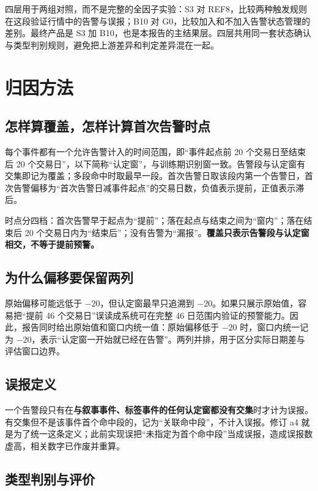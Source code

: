 \documentclass[12pt,a4paper]{ctexart}
\begin{document}
四层用于两组对照，而不是完整的全因子实验：S3 对 REF8，比较两种触发规则在这段验证行情中的告警与误报；B10 对 G0，比较加入和不加入告警状态管理的差别。最终产品是 S3 加 B10，也是本报告的主结果层。四层共用同一套状态确认与类型判别规则，避免把上游差异和判定差异混在一起。

\section{归因方法}

\subsection{怎样算覆盖，怎样计算首次告警时点}

每个事件都有一个允许告警计入的时间范围，即“事件起点前 20 个交易日至结束后 20 个交易日”，以下简称“认定窗”，与训练期识别窗一致。告警段与认定窗有交集即记为覆盖；多段命中时取最早一段。首次告警日取该段内第一个告警日，首次告警偏移为“首次告警日减事件起点”的交易日数，负值表示提前，正值表示滞后。

时点分四档：首次告警早于起点为“提前”；落在起点与结束之间为“窗内”；落在结束后 20 个交易日内为“结束后”；没有告警为“漏报”。\textbf{覆盖只表示告警段与认定窗相交，不等于提前预警。}

\subsection{为什么偏移要保留两列}

原始偏移可能远低于 $-20$，但认定窗最早只追溯到 $-20$。如果只展示原始值，容易把“提前 46 个交易日”误读成系统可在完整 46 日范围内验证的预警能力。因此，报告同时给出原始值和窗口内统一值：原始偏移低于 $-20$ 时，窗口内统一记为 $-20$，表示“认定窗一开始就已经在告警”。两列并排，用于区分实际日期差与评估窗口边界。

\subsection{误报定义}

一个告警段只有在\textbf{与叙事事件、标签事件的任何认定窗都没有交集}时才计为误报。有交集但不是该事件首个命中段的，记为“关联命中段”，不计入误报。修订 a4 就是为了统一这条定义；此前实现误把“未指定为首个命中段”当成误报，造成误报数虚高，相关数字已作废并重算。

\subsection{类型判别与评价}
\end{document}
